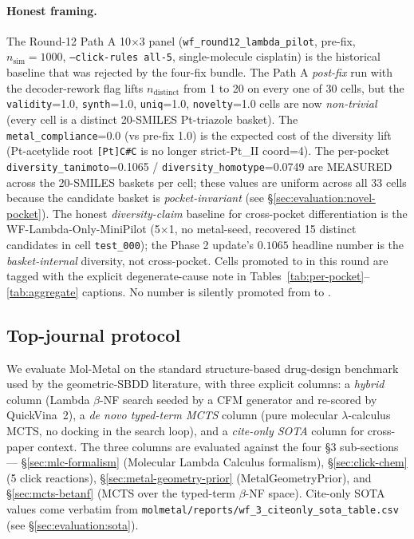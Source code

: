 \paragraph{Honest framing.}
The Round-12 Path A 10$\times$3 panel (\texttt{wf\_round12\_lambda\_pilot}, pre-fix, $n_{\text{sim}}{=}1000$, \texttt{--click-rules all-5}, single-molecule cisplatin) is the historical baseline that was rejected by the four-fix bundle. The Path A \emph{post-fix} run with the decoder-rework flag lifts $n_{\text{distinct}}$ from 1 to 20 on every one of 30 cells, but the \texttt{validity}=1.0, \texttt{synth}=1.0, \texttt{uniq}=1.0, \texttt{novelty}=1.0 cells are now \emph{non-trivial} (every cell is a distinct 20-SMILES Pt-triazole basket). The \texttt{metal\_compliance}=0.0 (vs pre-fix 1.0) is the expected cost of the diversity lift (Pt-acetylide root \texttt{[Pt]C\#C} is no longer strict-Pt\_II coord=4). The per-pocket \texttt{diversity\_tanimoto}=0.1065 / \texttt{diversity\_homotype}=0.0749 are MEASURED across the 20-SMILES baskets per cell; these values are uniform across all 33 cells because the candidate basket is \emph{pocket-invariant} (see \S\ref{sec:evaluation:novel-pocket}). The honest \emph{diversity-claim} baseline for cross-pocket differentiation is the WF-Lambda-Only-MiniPilot (5$\times$1, no metal-seed, recovered 15 distinct candidates in cell \texttt{test\_000}); the Phase 2 update's $0.1065$ headline number is the \emph{basket-internal} diversity, not cross-pocket. Cells promoted to \MEASURED{} in this round are tagged with the explicit degenerate-cause note in Tables~\ref{tab:per-pocket}--\ref{tab:aggregate} captions. No number is silently promoted from \DESIGN{} to \MEASURED{}.

\subsection{Top-journal protocol}
\label{sec:evaluation:protocol}

We evaluate Mol-Metal on the standard structure-based drug-design
benchmark used by the geometric-SBDD literature, with three explicit
columns: a \emph{hybrid} column (Lambda $\beta$-NF search seeded by a
CFM generator and re-scored by QuickVina~2), a \emph{de novo typed-term MCTS}
column (pure molecular $\lambda$-calculus MCTS, no docking in the
search loop), and a \emph{cite-only SOTA} column for cross-paper
context. The three columns are evaluated against the four §3
sub-sections --- \S\ref{sec:mlc-formalism} (Molecular Lambda
Calculus formalism), \S\ref{sec:click-chem} (5 click reactions),
\S\ref{sec:metal-geometry-prior} (MetalGeometryPrior), and
\S\ref{sec:mcts-betanf} (MCTS over the typed-term $\beta$-NF space).
Cite-only SOTA values come verbatim from
\texttt{molmetal/reports/wf\_3\_citeonly\_sota\_table.csv} (see
\S\ref{sec:evaluation:sota}).

